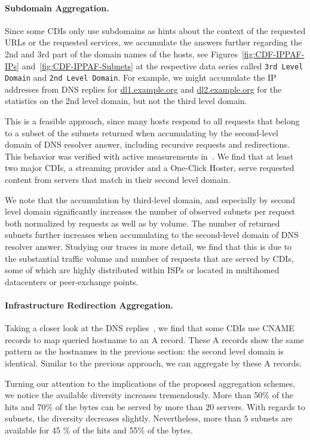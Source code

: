 \paragraph{Subdomain Aggregation.} Since some CDIs only use subdomains as hints
about the context of the requested URLs or the requested services, we
accumulate the answers further regarding the 2nd and 3rd part of the domain
names of the hosts, see Figures~\ref {fig:CDF-IPPAF-IPs}
and~\ref{fig:CDF-IPPAF-Subnets} at the respective data series called
\texttt{3rd Level Domain} and \texttt{2nd Level Domain}. For example, we might
accumulate the IP addresses from DNS replies for \url {dl1.example.org} and
\url{dl2.example.org} for the statistics on the 2nd level domain, but not the
third level domain.

This is a feasible approach, since many hosts respond to all requests that
belong to a subset of the subnets returned when accumulating by the
second-level domain of DNS resolver answer, including recursive requests and
redirections.  This behavior was verified with active measurements
in~\cite{PADIS2010}. We find that at least two major CDIs, a streaming provider
and a One-Click Hoster, serve requested content from servers that match in
their second level domain.

We note that the accumulation by third-level domain, and especially by second
level domain significantly increases the number of observed subnets per request
both normalized by requests as well as by volume.  The number of returned
subnets further increases when accumulating to the second-level domain of DNS
resolver answer. Studying our traces in more detail, we find that this is due
to the substantial traffic volume and number of requests that are served by
CDIs, some of which are highly distributed within ISPs or located in multihomed
datacenters or peer-exchange points.

\paragraph{Infrastructure Redirection Aggregation.}
Taking a closer look at the DNS replies~\cite{ietf-dns}, we find that some CDIs
use CNAME records to map queried hostname to an A record. These A records show
the same pattern as the hostnames in the previous section: the second level
domain is identical. Similar to the previous approach, we can aggregate by
these A records.


Turning our attention to the implications of the proposed aggregation schemes,
we notice the available diversity increases tremendously. More than 50\% of the
hits and 70\% of the bytes can be served by more than $20$ servers.  With
regards to subnets, the diversity decreases slightly. Nevertheless, more than
$5$ subnets are available for 45 \% of the hits and 55\% of the bytes.


